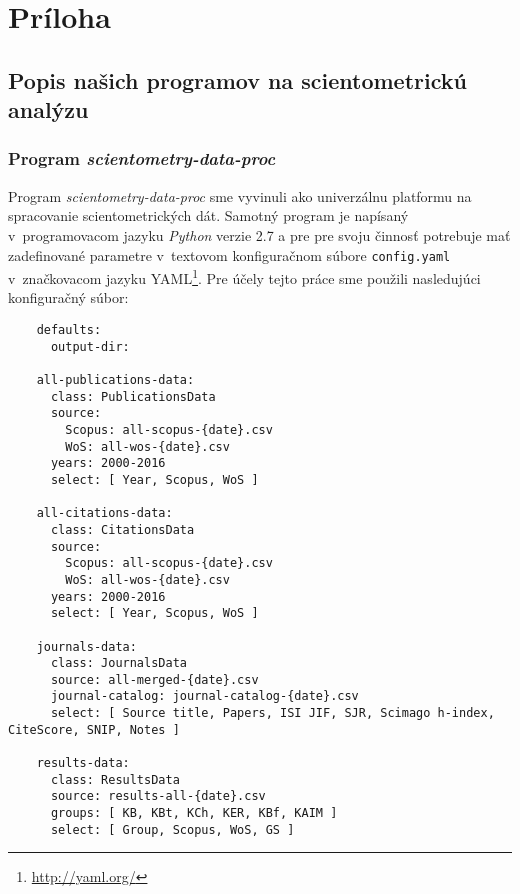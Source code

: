 \chapter*{Príloha}
\label{chap:appendix}

\section*{Popis našich programov na scientometrickú analýzu}


\subsection*{Program \emph{scientometry-data-proc}}

Program \emph{scientometry-data-proc} sme vyvinuli ako univerzálnu platformu na
spracovanie scientometrických dát.  Samotný program je napísaný v~programovacom
jazyku \emph{Python} verzie 2.7 a pre pre svoju činnosť potrebuje mať
zadefinované parametre v~textovom konfiguračnom súbore \verb|config.yaml|
v~značkovacom jazyku YAML\footnote{\url{http://yaml.org/}}.  Pre účely tejto
práce sme použili nasledujúci konfiguračný súbor:

\begin{source}
  \begin{verbatim}
    defaults:
      output-dir:

    all-publications-data:
      class: PublicationsData
      source:
        Scopus: all-scopus-{date}.csv
        WoS: all-wos-{date}.csv
      years: 2000-2016
      select: [ Year, Scopus, WoS ]

    all-citations-data:
      class: CitationsData
      source:
        Scopus: all-scopus-{date}.csv
        WoS: all-wos-{date}.csv
      years: 2000-2016
      select: [ Year, Scopus, WoS ]

    journals-data:
      class: JournalsData
      source: all-merged-{date}.csv
      journal-catalog: journal-catalog-{date}.csv
      select: [ Source title, Papers, ISI JIF, SJR, Scimago h-index, CiteScore, SNIP, Notes ]

    results-data:
      class: ResultsData
      source: results-all-{date}.csv
      groups: [ KB, KBt, KCh, KER, KBf, KAIM ]
      select: [ Group, Scopus, WoS, GS ]
  \end{verbatim}
\end{source}


